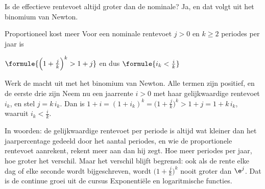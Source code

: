 
Is de effectieve rentevoet altijd groter dan de nominale? Ja, en dat volgt uit het binomium van Newton.

\begin{theorie}
\begin{stelling}{Proportioneel kost meer}
Voor een nominale rentevoet $j > 0$ en $k \geqslant 2$ periodes per jaar is

\vspace{1mm}
\qquad $\formule{\Bigl(1 + \frac{j}{k}\Bigr)^{k} > 1 + j}$ \qquad en dus \qquad $\formule{i_k < \frac{i}{k}}$
\end{stelling}

\begin{bewijs}
Werk de macht uit met het binomium van Newton. Alle termen zijn positief, en de eerste drie zijn
Neem nu een jaarrente $i > 0$ met haar gelijkwaardige rentevoet $i_k$, en stel $j = k\,i_k$. Dan is $1 + i = (1 + i_k)^k = \bigl(1 + \frac jk\bigr)^k > 1 + j = 1 + k\,i_k$, waaruit $i_k < \frac ik$.
\end{bewijs}
\end{theorie}

In woorden: de gelijkwaardige rentevoet per periode is altijd wat kleiner dan het jaarpercentage gedeeld door het aantal periodes, en wie de proportionele rentevoet aanrekent, rekent meer aan dan hij zegt. Hoe meer periodes per jaar, hoe groter het verschil. Maar het verschil blijft begrensd: ook als de rente elke dag of elke seconde wordt bijgeschreven, wordt $\bigl(1 + \frac jk\bigr)^k$ nooit groter dan $\e^{j}$. Dat is de continue groei uit de cursus Exponentiële en logaritmische functies.

